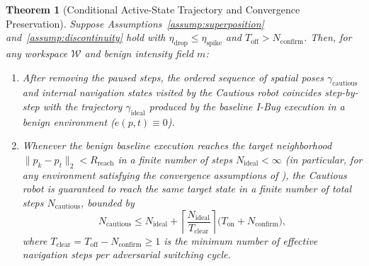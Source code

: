 \documentclass[12pt, a4paper]{article}
\newtheorem{theorem}{Theorem}
\begin{document}
\begin{theorem}[Conditional Active-State Trajectory and Convergence Preservation]
\label{thm:cautious_convergence}
Suppose Assumptions~\ref{assump:superposition} and~\ref{assump:discontinuity} hold with $\eta_{\text{drop}} \le \eta_{\text{spike}}$ and $T_{\text{off}} > N_{\text{confirm}}$. Then, for any workspace $\mathcal{W}$ and benign intensity field $m$:
\begin{enumerate}
    \item After removing the paused steps, the ordered sequence of spatial poses $\gamma_{\text{cautious}}$ and internal navigation states visited by the Cautious robot coincides step-by-step with the trajectory $\gamma_{\text{ideal}}$ produced by the baseline I-Bug execution in a benign environment ($e(p, t) \equiv 0$).
    \item Whenever the benign baseline execution reaches the target neighborhood $\|p_k - p_t\|_2 < R_{\text{reach}}$ in a finite number of steps $N_{\text{ideal}} < \infty$ (in particular, for any environment satisfying the convergence assumptions of \cite{taylor2014intensity}), the Cautious robot is guaranteed to reach the same target state in a finite number of total steps $N_{\text{cautious}}$, bounded by
    \begin{equation}
        N_{\text{cautious}} \le N_{\text{ideal}} + \left\lceil \frac{N_{\text{ideal}}}{T_{\text{clear}}} \right\rceil \bigl(T_{\text{on}} + N_{\text{confirm}}\bigr),
        \label{eq:step_bound}
    \end{equation}
    where $T_{\text{clear}} = T_{\text{off}} - N_{\text{confirm}} \ge 1$ is the minimum number of effective navigation steps per adversarial switching cycle.
\end{enumerate}
\end{theorem}
\end{document}
